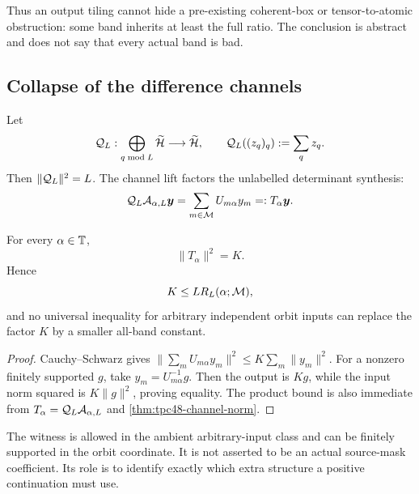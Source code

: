 Thus an output tiling cannot hide a pre-existing coherent-box or
tensor-to-atomic obstruction: some band inherits at least the full
ratio.  The conclusion is abstract and does not say that every actual
band is bad.

\subsection{Collapse of the difference channels}

Let
\begin{equation}
 \mathcal Q_L:\bigoplus_{q\bmod L}\widetilde{\mathcal H}
 \longrightarrow\widetilde{\mathcal H},
 \qquad
 \mathcal Q_L((z_q)_q):=\sum_qz_q.
 \label{eq:tpc48-channel-collapse}
\end{equation}
Then \(\|\mathcal Q_L\|^2=L\).  The channel lift factors the unlabelled
determinant synthesis:
\begin{equation}
 \mathcal Q_L\mathcal A_{\alpha,L}\bm y
 =\sum_{m\in\mathcal M}U_{m\alpha}y_m
 =:T_\alpha\bm y.
 \label{eq:tpc48-channel-factorization}
\end{equation}

\begin{theorem}
\label{thm:tpc48-unrestricted-barrier}
For every \(\alpha\in\mathbb T\),
\begin{equation}
 \boxed{\|T_\alpha\|^2=K.}
 \label{eq:tpc48-unrestricted-barrier}
\end{equation}
Hence
\begin{equation}
 K\le L R_L(\alpha;\mathcal M),
 \label{eq:tpc48-factor-product}
\end{equation}
and no universal inequality for arbitrary independent orbit inputs can
replace the factor \(K\) by a smaller all-band constant.
\end{theorem}

\begin{proof}
Cauchy--Schwarz gives
\(\|\sum_mU_{m\alpha}y_m\|^2\le K\sum_m\|y_m\|^2\).
For a nonzero finitely supported \(g\), take
\(y_m=U_{m\alpha}^{-1}g\).  Then the output is \(Kg\), while the input
norm squared is \(K\|g\|^2\), proving equality.  The product bound is
also immediate from
\(T_\alpha=\mathcal Q_L\mathcal A_{\alpha,L}\) and
\cref{thm:tpc48-channel-norm}.
\end{proof}

The witness is allowed in the ambient arbitrary-input class and can be
finitely supported in the orbit coordinate.  It is not asserted to be
an actual source-mask coefficient.  Its role is to identify exactly
which extra structure a positive continuation must use.


